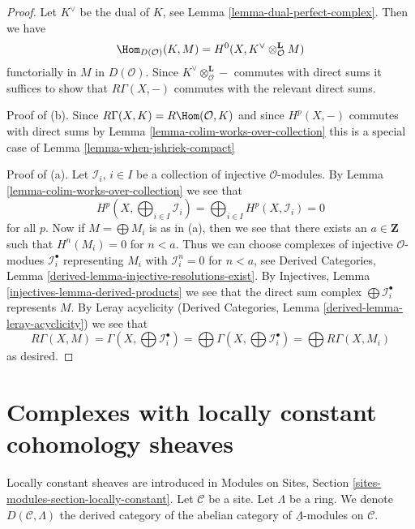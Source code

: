 \begin{proof}
Let $K^\vee$ be the dual of $K$, see
Lemma \ref{lemma-dual-perfect-complex}. Then we have
$$
\Hom_{D(\mathcal{O})}(K, M) =
H^0(X, K^\vee \otimes_\mathcal{O}^\mathbf{L} M)
$$
functorially in $M$ in $D(\mathcal{O})$.
Since $K^\vee \otimes_\mathcal{O}^\mathbf{L} -$ commutes with
direct sums it suffices
to show that $R\Gamma(X, -)$ commutes with the relevant direct sums.

\medskip\noindent
Proof of (b). Since $R\Gamma(X, K) = R\Hom(\mathcal{O}, K)$
and since $H^p(X, -)$ commutes with direct sums by
Lemma \ref{lemma-colim-works-over-collection}
this is a special case of
Lemma \ref{lemma-when-jshriek-compact}

\medskip\noindent
Proof of (a). Let $\mathcal{I}_i$, $i \in I$ be a collection of injective
$\mathcal{O}$-modules. By Lemma \ref{lemma-colim-works-over-collection}
we see that
$$
H^p(X, \bigoplus\nolimits_{i \in I} \mathcal{I}_i) =
\bigoplus\nolimits_{i \in I} H^p(X, \mathcal{I}_i) = 0
$$
for all $p$. Now if $M = \bigoplus M_i$ is as in (a), then we
see that there exists an $a \in \mathbf{Z}$ such that $H^n(M_i) = 0$
for $n < a$. Thus we can choose complexes of injective $\mathcal{O}$-modues
$\mathcal{I}_i^\bullet$ representing $M_i$
with $\mathcal{I}_i^n = 0$ for $n < a$, see
Derived Categories, Lemma \ref{derived-lemma-injective-resolutions-exist}.
By Injectives, Lemma \ref{injectives-lemma-derived-products}
we see that the direct sum complex $\bigoplus \mathcal{I}_i^\bullet$
represents $M$. By Leray acyclicity
(Derived Categories, Lemma \ref{derived-lemma-leray-acyclicity})
we see that
$$
R\Gamma(X, M) = \Gamma(X, \bigoplus \mathcal{I}_i^\bullet) =
\bigoplus \Gamma(X, \bigoplus \mathcal{I}_i^\bullet) =
\bigoplus R\Gamma(X, M_i)
$$
as desired.
\end{proof}






\section{Complexes with locally constant cohomology sheaves}
\label{section-locally-constant}

\noindent
Locally constant sheaves are introduced in
Modules on Sites, Section \ref{sites-modules-section-locally-constant}.
Let $\mathcal{C}$ be a site.
Let $\Lambda$ be a ring.
We denote $D(\mathcal{C}, \Lambda)$ the derived category of the
abelian category of $\underline{\Lambda}$-modules on $\mathcal{C}$.

